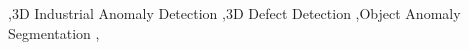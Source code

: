 \documentclass[a4paper,fleqnn]{cas-sc}
\begin{document}
\begin{keywords}
 \sep 3D Industrial Anomaly Detection \sep 3D Defect Detection \sep Object Anomaly Segmentation \sep
\end{keywords}

\maketitle


 
%

%

%









\end{document}

